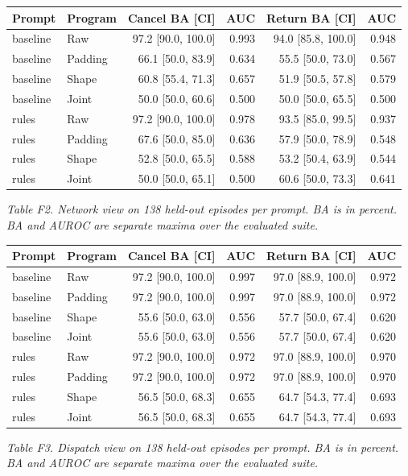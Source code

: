 \documentclass[10pt,letterpaper]{article}
\begin{document}
\begin{center}\small
\begin{tabular}{@{}llrrrr@{}}\toprule
Prompt & Program & Cancel BA [CI] & AUC & Return BA [CI] & AUC\\\midrule
baseline & Raw & 97.2 [90.0, 100.0] & 0.993 & 94.0 [85.8, 100.0] & 0.948\\
baseline & Padding & 66.1 [50.0, 83.9] & 0.634 & 55.5 [50.0, 73.0] & 0.567\\
baseline & Shape & 60.8 [55.4, 71.3] & 0.657 & 51.9 [50.5, 57.8] & 0.579\\
baseline & Joint & 50.0 [50.0, 60.6] & 0.500 & 50.0 [50.0, 65.5] & 0.500\\
rules & Raw & 97.2 [90.0, 100.0] & 0.978 & 93.5 [85.0, 99.5] & 0.937\\
rules & Padding & 67.6 [50.0, 85.0] & 0.636 & 57.9 [50.0, 78.9] & 0.548\\
rules & Shape & 52.8 [50.0, 65.5] & 0.588 & 53.2 [50.4, 63.9] & 0.544\\
rules & Joint & 50.0 [50.0, 65.1] & 0.500 & 60.6 [50.0, 73.3] & 0.641\\
\bottomrule\end{tabular}
\end{center}
\noindent\textit{Table F2. Network view on 138 held-out episodes per prompt. BA is in percent. BA and AUROC are separate maxima over the evaluated suite.}
\par\medskip

\begin{center}\small
\begin{tabular}{@{}llrrrr@{}}\toprule
Prompt & Program & Cancel BA [CI] & AUC & Return BA [CI] & AUC\\\midrule
baseline & Raw & 97.2 [90.0, 100.0] & 0.997 & 97.0 [88.9, 100.0] & 0.972\\
baseline & Padding & 97.2 [90.0, 100.0] & 0.997 & 97.0 [88.9, 100.0] & 0.972\\
baseline & Shape & 55.6 [50.0, 63.0] & 0.556 & 57.7 [50.0, 67.4] & 0.620\\
baseline & Joint & 55.6 [50.0, 63.0] & 0.556 & 57.7 [50.0, 67.4] & 0.620\\
rules & Raw & 97.2 [90.0, 100.0] & 0.972 & 97.0 [88.9, 100.0] & 0.970\\
rules & Padding & 97.2 [90.0, 100.0] & 0.972 & 97.0 [88.9, 100.0] & 0.970\\
rules & Shape & 56.5 [50.0, 68.3] & 0.655 & 64.7 [54.3, 77.4] & 0.693\\
rules & Joint & 56.5 [50.0, 68.3] & 0.655 & 64.7 [54.3, 77.4] & 0.693\\
\bottomrule\end{tabular}
\end{center}
\noindent\textit{Table F3. Dispatch view on 138 held-out episodes per prompt. BA is in percent. BA and AUROC are separate maxima over the evaluated suite.}
\par\medskip
\end{document}
